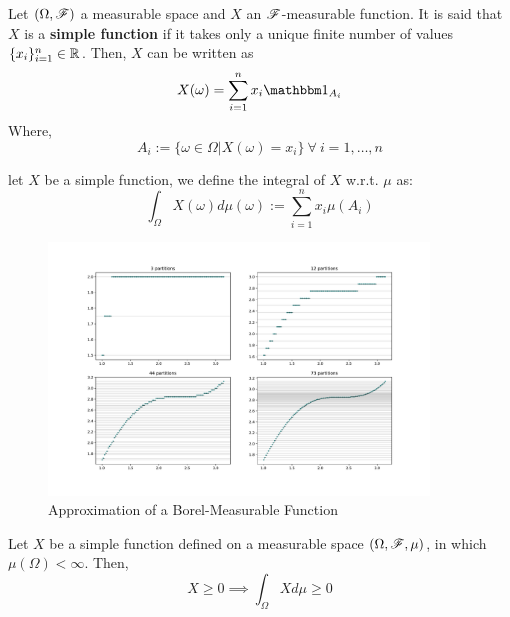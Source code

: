 \documentclass[../TGMAFFIRO.tex]{subfiles}
\begin{document}
\begin{definition}
	Let $(\Omega, \mathscr{F})$ a measurable space and $X$ an $\mathscr{F}$-measurable function. It is said that $X$ is a \textbf{simple function} if it takes only a unique finite number of values $\{x_i\}_{i=1}^{n} \in \mathbb{R}$. Then, $X$ can be written as
	\begin{equation}
		X(\omega) = \sum_{i=1}^{n}x_i\ind_{A_i}
	\end{equation}
	Where,
	\[
		A_i := \{\omega \in \Omega | X(\omega) = x_i\} \ \forall \ i = 1, \ldots, n
	\]
\end{definition}

\begin{definition}
	let $X$ be a simple function, we define the integral of $X$ w.r.t. $\mu$ as:
	\begin{equation}
		\int_\Omega X(\omega) d\mu(\omega) := \sum_{i=1}^{n}x_i\mu(A_i)
	\end{equation}
\end{definition}


\begin{figure}[h]
	\centering
	\label{fig:simple_approx_sine}
	\includegraphics[width=0.9\textwidth]{images/simple_sine.pdf}	
	\caption{Approximation of a Borel-Measurable Function}
\end{figure}

\begin{proposition} \label{prop:nnlmsf}
	Let $X$ be a simple function defined on a measurable space $(\Omega, \mathscr{F}, \mu)$, in which $\mu(\Omega) < \infty$. Then,
	\begin{equation}
		X \geq 0 \implies \int_\Omega X d\mu \geq 0
	\end{equation}
\end{proposition}
\end{document}
